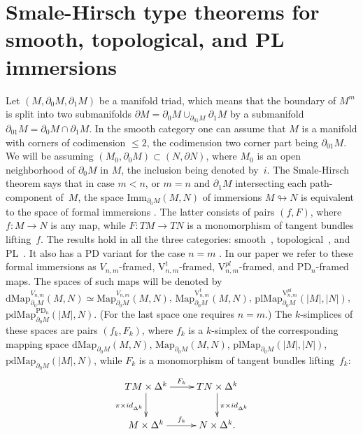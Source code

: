 \documentclass[11pt]{amsart}
\theoremstyle{definition}
\newcommand{\Imm}{\mathrm{Imm}}
\newcommand{\Map}{\mathrm{Map}}
\newcommand{\dMap}{\mathrm{dMap}}
\newcommand{\plMap}{\mathrm{plMap}}
\newcommand{\pdMap}{\mathrm{pdMap}}
\newcommand{\PD}{\mathrm{PD}}
\newcommand{\VV}{\mathrm{V}}
\numberwithin{equation}{section}
\begin{document}
\section{Smale-Hirsch type theorems for smooth, topological, and PL immersions}\label{s:imm}
Let $(M,\partial_0 M,\partial_1M)$ be a manifold triad, which means that the boundary of $M^m$ is split into 
two submanifolds %
 $\partial M=\partial_0 M\cup_{\partial_{01}M}\partial_1 M$ by a submanifold $\partial_{01}M=\partial_0 M\cap\partial_1M$.
In the smooth category one can assume that $M$ is a manifold with  corners of codimension $\leq 2$, the codimension two corner part being $\partial_{01}M$. We will be assuming $(M_0,\partial_0M)\subset
(N,\partial N)$, where $M_0$ is an open neighborhood of $\partial_0M$ in $M$, the inclusion being denoted by~$i$.
The Smale-Hirsch theorem says that in case $m<n$, or $m=n$ and $\partial_1 M$ intersecting each path-component of~$M$,  
the space $\Imm_{\partial_0M}(M,N)$ of immersions $M\looparrowright N$ is equivalent to the space of formal immersions \cite{Smale_imm,Hirsch}. The latter
consists of pairs $(f,F)$, where $f\colon M\to N$ is any map, while $F\colon TM\to TN$ is a monomorphism of tangent bundles lifting~$f$.
The results hold in all the three categories: smooth~\cite{Smale_imm,Hirsch}, topological~\cite{Lees,Kurata}, and PL~\cite{HaeflPoen_imm}. It also has a PD variant 
for the case $n=m$ \cite{BL_diff}. In our paper we refer to these formal immersions as $V_{n,m}$-framed, $\VV_{n,m}^t$-framed, $\VV_{n,m}^{pl}$-framed,
and $\PD_n$-framed maps. The spaces of such maps will be denoted by $\dMap_{\partial_0M}^{V_{n,m}}(M,N)\simeq\Map_{\partial_0M}^{V_{n,m}}(M,N)$,
$\Map_{\partial_0M}^{\VV_{n,m}^t}(M,N)$, $\plMap_{\partial_0M}^{\VV_{n,m}^{pl}}(|M|,|N|)$, $\pdMap_{\partial_0M}^{\PD_n}(|M|,N)$.
(For the last space one requires $n=m$.) The $k$-simplices of these spaces are pairs $(f_k,F_k)$, where $f_k$ is a $k$-simplex of the corresponding 
mapping  space  $\dMap_{\partial_0M}(M,N)$,
$\Map_{\partial_0M}(M,N)$, $\plMap_{\partial_0M}(|M|,|N|)$, $\pdMap_{\partial_0M}(|M|,N)$, while $F_k$ is a monomorphism of tangent bundles
lifting~$f_k$:
\begin{equation}\label{eq:tangent_mono}
\xymatrix{
TM\times\Delta^k\ar[d]_{\pi\times id_{\Delta^k}}\ar[r]^{F_k}&TN\times\Delta^k\ar[d]^{\pi\times id_{\Delta^k}}\\
M\times\Delta^k\ar[r]^{f_k}& N\times\Delta^k.
}
\end{equation}
\end{document}
